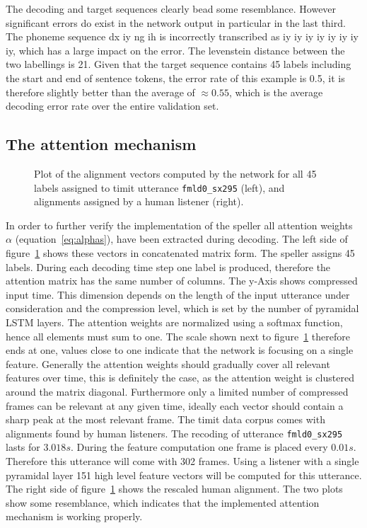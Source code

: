 The decoding and target sequences clearly bead some resemblance. However significant errors do exist in the network output in particular in the last third. The phoneme sequence dx  iy  ng  ih is incorrectly transcribed as iy  iy  iy  iy  iy  iy  iy iy,
which has a large impact on the error. The levenstein distance between the two labellings is 21. Given that the target sequence contains 45 labels including the start and end of sentence tokens, the error rate of this example is 0.5, it is therefore slightly better than the average of $\approx 0.55$, which is the average decoding error rate over the entire validation set.

\subsection{The attention mechanism}
\begin{figure}
\centering


\caption{Plot of the alignment vectors computed by the network for all 45 labels assigned to timit utterance \texttt{fmld0\_sx295} (left), and alignments assigned by a human listener (right).}
\label{fig:fullAttention}
\end{figure}
In order to further verify the implementation of the speller all attention weights $\alpha$ (equation~\ref{eq:alphas}), have been extracted during decoding. The left side of figure~\ref{fig:fullAttention} shows these vectors in concatenated matrix form. The speller assigns 45 labels. During each decoding time step one label is produced, therefore the attention matrix has the same number of columns. The y-Axis shows compressed input time. This dimension depends on the length of the input utterance under consideration and the compression level, which is set by the number of pyramidal LSTM layers. The attention weights are normalized using a softmax function, hence all elements must sum to one. The scale shown next to figure~\ref{fig:fullAttention} therefore ends at one, values close to one indicate that the network is focusing on a single feature. Generally the attention weights should gradually cover all relevant features over time, this is definitely the case, as the attention weight is clustered around the matrix diagonal. 
Furthermore only a limited number of compressed frames can be relevant at any given time, ideally each vector should contain a sharp peak at the most relevant frame.   
The timit data corpus comes with alignments found by human listeners. The recoding of utterance \texttt{fmld0\_sx295} lasts for $3.018s$. During the feature computation one frame is placed every $0.01s$. Therefore this utterance will come with 302 frames. Using a listener with a single pyramidal layer 151 high level feature vectors will be computed for this utterance. The right side of figure~\ref{fig:fullAttention} shows the rescaled human alignment. The two plots show some resemblance, which indicates that the implemented attention mechanism is working properly. 
